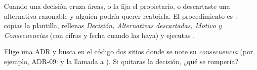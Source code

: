 \begin{porque}
Cuando una decisión cruza áreas, o la fija el propietario, o descartaste una alternativa
razonable y alguien podría querer reabrirla. El procedimiento es
: copias la plantilla, rellenas \emph{Decisión,
Alternativas descartadas, Motivo y Consecuencias} (con cifras y fecha cuando las haya) y
ejecutas .
\end{porque}

\begin{ejercicio}
Elige una ADR y busca en el código dos sitios donde se note su \emph{consecuencia} (por
ejemplo, ADR-09:  y la llamada a ). Si quitaras la
decisión, ¿qué se rompería?
\end{ejercicio}

